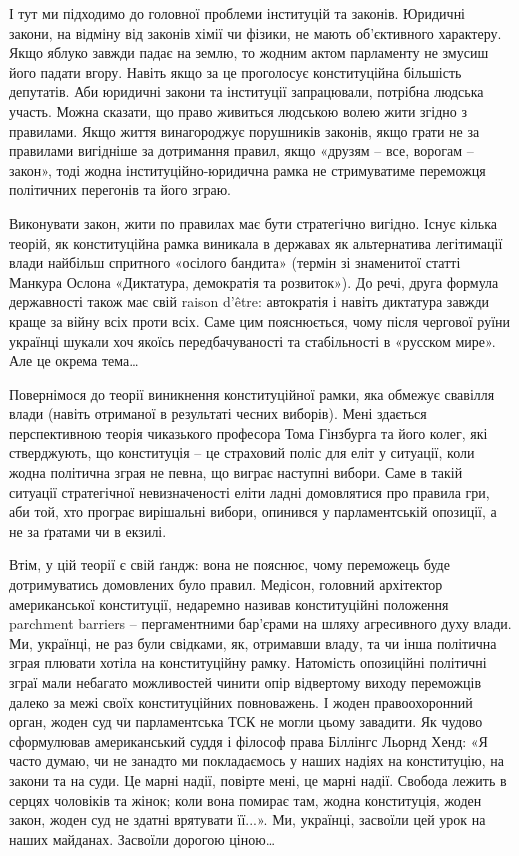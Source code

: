 І тут ми підходимо до головної проблеми інституцій та законів. Юридичні закони,
на відміну від законів хімії чи фізики, не мають об’єктивного характеру. Якщо
яблуко завжди падає на землю, то жодним актом парламенту не змусиш його падати
вгору. Навіть якщо за це проголосує конституційна більшість депутатів. Аби
юридичні закони та інституції запрацювали, потрібна людська участь. Можна
сказати, що право живиться людською волею жити згідно з правилами. Якщо життя
винагороджує порушників законів, якщо грати не за правилами вигідніше за
дотримання правил, якщо «друзям – все, ворогам – закон», тоді жодна
інституційно-юридична рамка не стримуватиме переможця політичних перегонів та
його зграю.

Виконувати закон, жити по правилах має бути стратегічно вигідно. Існує кілька
теорій, як конституційна рамка виникала в державах як альтернатива легітимації
влади найбільш спритного «осілого бандита» (термін зі знаменитої статті Манкура
Ослона «Диктатура, демократія та розвиток»). До речі, друга формула державності
також має свій raison d'être: автократія і навіть диктатура завжди краще за
війну всіх проти всіх. Саме цим пояснюється, чому після чергової руїни українці
шукали хоч якоїсь передбачуваності та стабільності в «русском мире». Але це
окрема тема…

Повернімося до теорії виникнення конституційної рамки, яка обмежує свавілля
влади (навіть отриманої в результаті чесних виборів). Мені здається
перспективною теорія чиказького професора Тома Гінзбурга та його колег, які
стверджують, що конституція – це страховий поліс для еліт у ситуації, коли
жодна політична зграя не певна, що виграє наступні вибори. Саме в такій
ситуації стратегічної невизначеності еліти ладні домовлятися про правила гри,
аби той, хто програє вирішальні вибори, опинився у парламентській опозиції, а
не за ґратами чи в екзилі.

Втім, у цій теорії є свій ґандж: вона не пояснює, чому переможець буде
дотримуватись домовлених було правил. Медісон, головний архітектор
американської конституції, недаремно називав конституційні положення parchment
barriers – пергаментними бар’єрами на шляху агресивного духу влади. Ми,
українці, не раз були свідками, як, отримавши владу, та чи інша політична зграя
плювати хотіла на конституційну рамку. Натомість опозиційні політичні зграї
мали небагато можливостей чинити опір відвертому виходу переможців далеко за
межі своїх конституційних повноважень. І жоден правоохоронний орган, жоден суд
чи парламентська ТСК не могли цьому завадити. Як чудово сформулював
американський суддя і філософ права Біллінгс Льорнд Хенд: «Я часто думаю, чи не
занадто ми покладаємось у наших надіях на конституцію, на закони та на суди. Це
марні надії, повірте мені, це марні надії. Свобода лежить в серцях чоловіків та
жінок; коли вона помирає там, жодна конституція, жоден закон, жоден суд не
здатні врятувати її...». Ми, українці, засвоїли цей урок на наших майданах.
Засвоїли дорогою ціною…

